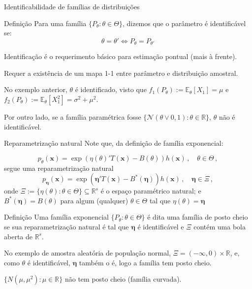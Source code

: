 \documentclass[11pt]{beamer}
\newenvironment{halfwideitemize}{\itemize\addtolength{\itemsep}{0.5em}}{\enditemize}
\begin{document}
	\begin{frame}{Identificabilidade de famílias de distribuições}
		\begin{block}{Definição}
			Para uma família $\{P_\theta: \theta \in \Theta\}$, dizemos que o parâmetro é identificável se:
			$$\theta = \theta' \iff P_{\theta} = P_{\theta'}$$
		\end{block}
		\begin{halfwideitemize}
			\item Identificação é o requerimento básico para estimação pontual (mais à frente).
			\begin{halfwideitemize}
				\item Requer a existência de um mapa 1-1 entre parâmetro e distribuição amostral.
			\end{halfwideitemize}
			\item No exemplo anterior, $\theta$ é identificado, visto que $f_1(P_\theta) := \mathbb{E}_\theta[X_1] = \mu$ e $f_2(P_\theta) := \mathbb{E}_\theta[X_1^2] = \sigma^2 + \mu^2$.
			\item Por outro lado, se a família paramétrica fosse $\{\mathcal{N}( \theta \lor 0, 1): \theta \in \mathbb{R}\}$, $\theta$ não é identificável.
		\end{halfwideitemize}
	\end{frame}
	\begin{frame}{Reparametrização natural}
		Note que, da definição de família exponencial:
		
		$$p_\theta(\boldsymbol{x}) = \exp(\eta(\theta)'T(\boldsymbol{x}) -B(\theta)) h(\boldsymbol{x}) \, , \quad  \theta \in \Theta \, ,$$
		segue uma reparametrização {\color{blue}natural}
		$$p_{\boldsymbol{\eta}}(\boldsymbol{x}) = \exp(\boldsymbol{\eta}'T(\boldsymbol{x}) -B^*(\boldsymbol{\eta})) h(\boldsymbol{x}) \, , \quad \boldsymbol{\eta} \in \Xi \, ,$$
		onde $\Xi := \{ \eta(\theta): \theta \in \Theta\} \subseteq \mathbb{R}^s$ é o {\color{blue}espaço paramétrico natural}; e $B^*(\boldsymbol{\eta}) = B(\theta)$ para algum (qualquer) $\theta \in \Theta$ tal que $\eta(\theta) = \boldsymbol{\eta}$
		
		\begin{block}{Definição}
			Uma família exponencial $\{P_\theta: \theta \in \Theta\}$ é dita uma família de posto cheio se sua reparametrização natural é tal que $\boldsymbol{\eta}$ é identificável e $\Xi$ contém uma bola aberta de $\mathbb{R}^s$.
		\end{block}
		\begin{halfwideitemize}
			\item No exemplo de amostra aleatória de população normal, $\Xi = (-\infty,0) \times \mathbb{R}$, e, como $\theta$ é identificável, $\boldsymbol{\eta}$ também o é, logo a família tem posto cheio.
			\item $\{N(\mu, \mu^2): \mu \in \mathbb{R}\}$ não tem posto cheio (família curvada).
		\end{halfwideitemize}
	\end{frame}
\end{document}
